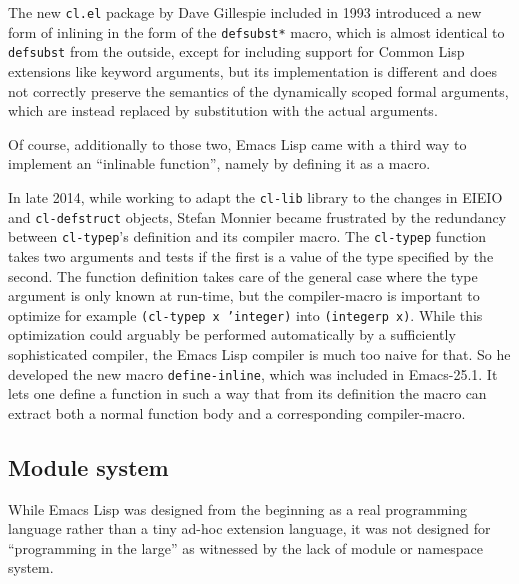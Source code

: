 \documentclass[format=acmsmall, review]{acmart}
\newcommand \Elisp {Emacs Lisp}
\begin{document}
The new \texttt{cl.el} package by Dave Gillespie included in 1993 introduced
a new form of inlining in the form of the \texttt{defsubst*} macro, which is
almost identical to \texttt{defsubst} from the outside, except for including
support for Common Lisp extensions like keyword arguments, but its
implementation is different and does not correctly preserve the semantics of
the dynamically scoped formal arguments, which are instead replaced by
substitution with the actual arguments.

Of course, additionally to those two, \Elisp{} came with a third way to
implement an ``inlinable function'', namely by defining it as a macro.

In late 2014, while working to adapt the \texttt{cl-lib} library to the
changes in EIEIO and \texttt{cl-defstruct} objects, Stefan Monnier became
frustrated by the redundancy between \texttt{cl-typep}'s definition and its
compiler macro.  The \texttt{cl-typep} function takes two arguments and tests if the first is
a value of the type specified by the second.  The function definition takes
care of the general case where the type argument is only known at run-time,
but the compiler-macro is important to optimize for example
\texttt{(cl-typep x 'integer)} into \texttt{(integerp x)}.  While this
optimization could arguably be performed automatically by a sufficiently
sophisticated compiler, the \Elisp{} compiler is much too naive for that.
So he developed the new macro \texttt{define-inline}, which was included in
Emacs-25.1.  It lets one define a function in such a way that from its
definition the macro can extract both a normal function body and
a corresponding compiler-macro.


\subsection{Module system}
\label{sec:module-system}

While \Elisp{} was designed from the beginning as a real programming
language rather than a tiny ad-hoc extension language, it was not designed
for ``programming in the large'' as witnessed by the lack of module or
namespace system.
\end{document}
